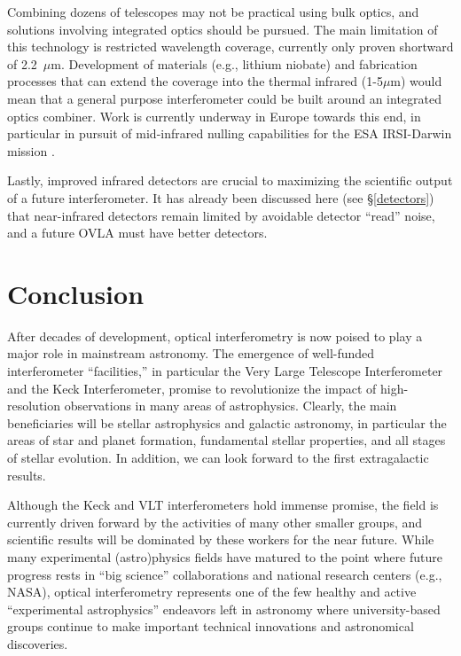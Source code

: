 \documentclass[12pt]{iopart}
\begin{document}
Combining dozens of telescopes may not be practical using bulk optics,
and solutions involving integrated optics should be pursued. The main
limitation of this technology is restricted wavelength coverage,
currently only proven shortward of 2.2~$\mu$m.  Development of
materials (e.g., lithium niobate) and fabrication processes that can
extend the coverage into the thermal infrared (1-5$\mu$m) would mean
that a general purpose interferometer could be built around an
integrated optics combiner.  Work is currently underway in Europe
towards this end, in particular in pursuit of mid-infrared nulling
capabilities for the ESA IRSI-Darwin mission \citep{haguenauer2002}.

Lastly, improved infrared detectors are crucial to maximizing the
scientific output of a future interferometer. It has already been
discussed here (see \S\ref{detectors}) that near-infrared detectors
remain limited by avoidable detector ``read'' noise, and 
a future OVLA must have better detectors.  


\section{Conclusion}
After decades of development, optical interferometry is now poised to
play a major role in mainstream astronomy. The emergence of
well-funded interferometer ``facilities,'' in particular the Very
Large Telescope Interferometer and the Keck Interferometer, promise to
revolutionize the impact of high-resolution observations in many areas
of astrophysics.  Clearly, the main beneficiaries will be 
stellar astrophysics and galactic astronomy, in particular the areas
of star and planet formation, fundamental stellar properties, and all
stages of stellar evolution.  In addition, we can look forward to the first
extragalactic results.

Although the Keck and VLT interferometers hold immense promise, the
field is currently driven forward by the activities of many other
smaller groups, and scientific results will be dominated by these
workers for the near future.  While many experimental (astro)physics
fields have matured to the point where future progress rests in ``big
science'' collaborations and national research centers (e.g., NASA),
optical interferometry represents one of the few healthy and active
``experimental astrophysics'' endeavors left in astronomy where
university-based groups continue to make important technical
innovations and astronomical discoveries.
\end{document}
